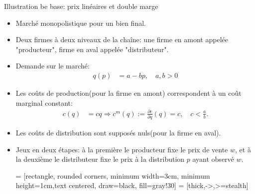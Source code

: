 \begin{frame}[allowframebreaks]{Illustration be base: prix linéaires et double marge}
\begin{itemize}
\item Marché monopolistique pour un bien final. 
\item Deux firmes à deux niveaux de la chaîne: une firme en amont appelée "producteur", firme en aval appelée "distributeur".
\item Demande sur le marché: 
\begin{align*}
    q(p) &= a-bp, \quad a, b > 0
\end{align*}
\item Les coûts de production(pour la firme en amont) correspondent à un coût marginal constant:
\begin{align*}
    c(q) &= cq \Rightarrow c^{m}(q) := \frac{\partial c}{\partial q}(q) = c, \quad c<\frac{a}{b}.
\end{align*}
\item Les coûts de distribution sont supposés nuls(pour la firme en aval). 
\item Jeux en deux étapes: à la première le producteur fixe le prix de vente $w$, et à la deuxième le distributeur fixe 
le prix à la distribution $p$ ayant observé $w$. 


\framebreak

 = [rectangle, rounded corners, minimum width=3cm, minimum height=1cm,text centered, draw=black,
 fill=gray!30]
  = [thick,->,>=stealth]
\begin{figure}
\end{figure}

\framebreak


\end{itemize}
\end{frame}
